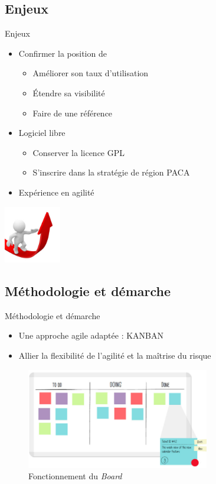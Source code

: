 \subsection{Enjeux}
\JulianSpeak
\begin{frame}{Enjeux}
			\begin{itemize}
				\item Confirmer la position de 
				\begin{itemize}
					\item Améliorer son taux d'utilisation
					\item Étendre sa visibilité
					\item Faire de  une référence
				\end{itemize}
				\vfill
				\item Logiciel libre
				\begin{itemize}
					\item Conserver la licence GPL
					\item S'inscrire dans la stratégie de région PACA
				\end{itemize}
				\vfill
				\item Expérience en agilité
			\end{itemize}


	\centering
			\includegraphics[width=2.5cm]{up.jpg}
			

\end{frame}
\subsection{Méthodologie et démarche}
\begin{frame}{Méthodologie et démarche}
	\begin{itemize}
		\item Une approche agile adaptée : KANBAN
		\item Allier la flexibilité de l'agilité et la maîtrise du risque
	\end{itemize}
	\begin{figure}[H]
		\includegraphics[width=8cm]{kanban.png}
		\caption{Fonctionnement du \textit{Board}}
	\end{figure}
\end{frame}
\SteveSpeak
